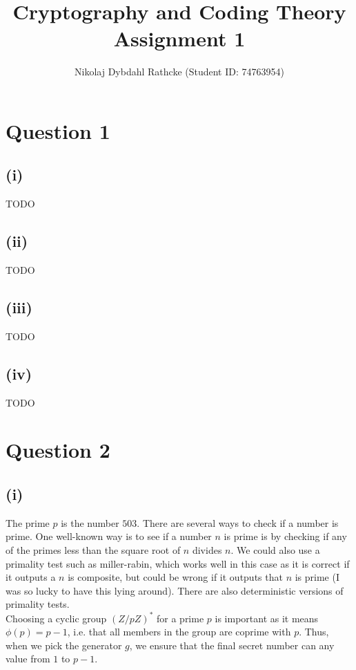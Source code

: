 \documentclass[a4paper, fleqn]{article}
\author{Nikolaj Dybdahl Rathcke (Student ID: 74763954)}
\title{Cryptography and Coding Theory \\ Assignment 1}
\begin{document}
\maketitle

\section{Question 1}
\subsection{(i)}
TODO

\subsection{(ii)}
TODO

\subsection{(iii)}
TODO

\subsection{(iv)}
TODO

\section{Question 2}

\subsection{(i)}
The prime $p$ is the number $503$. There are several ways to check if a number is prime. One well-known way is to see if a number $n$ is prime is by checking if any of the primes less than the square root of $n$ divides $n$. We could also use a primality test such as miller-rabin, which works well in this case as it is correct if it outputs a $n$ is composite, but could be wrong if it outputs that $n$ is prime (I was so lucky to have this lying around). There are also deterministic versions of primality tests. \\
Choosing a cyclic group $(Z/pZ)^*$ for a prime $p$ is important as it means $\phi(p)=p-1$, i.e. that all members in the group are coprime with $p$. Thus, when we pick the generator $g$, we ensure that the final secret number can any value from $1$ to $p-1$.
\end{document}
